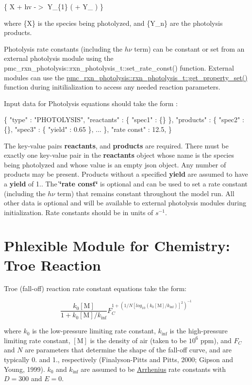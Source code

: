 \{ X + hv -\/$>$ Y\+\_\+\{1\} ( + Y\+\_  ) \}

where \{X\} is the species being photolyzed, and \{Y\+\_\+n\} are the photolysis products.

Photolysis rate constants (including the $h\nu$ term) can be constant or set from an external photolysis module using the {\ttfamily pmc\+\_\+rxn\+\_\+photolysis\+::rxn\+\_\+photolysis\+\_\+t\+::set\+\_\+rate\+\_\+const()} function. External modules can use the {\ttfamily \mbox{\hyperlink{structpmc__rxn__photolysis_1_1rxn__photolysis__t_a4af30a86fec5ca621eae12b191214630}{pmc\+\_\+rxn\+\_\+photolysis\+::rxn\+\_\+photolysis\+\_\+t\+::get\+\_\+property\+\_\+set()}}} function during initilialization to access any needed reaction parameters.

Input data for Photolysis equations should take the form \+: 
\begin{DoxyCode}
\{
  "type" : "PHOTOLYSIS",
  "reactants" : \{
    "spec1" : \{\}
  \},
  "products" : \{
    "spec2" : \{\},
    "spec3" : \{ "yield" : 0.65 \},
    ...
  \},
  "rate const" : 12.5,
\}
\end{DoxyCode}
 The key-\/value pairs {\bfseries reactants}, and {\bfseries products} are required. There must be exactly one key-\/value pair in the {\bfseries reactants} object whose name is the species being photolyzed and whose value is an empty {\ttfamily json} object. Any number of products may be present. Products without a specified {\bfseries yield} are assumed to have a {\bfseries yield} of 1.. The {\bfseries \char`\"{}rate const\char`\"{}} is optional and can be used to set a rate constant (including the $h\nu$ term) that remains constant throughout the model run. All other data is optional and will be available to external photolysis modules during initialization. Rate constants should be in units of $s^{-1}$. \hypertarget{phlex_rxn_troe}{}\section{Phlexible Module for Chemistry\+: Troe Reaction}\label{phlex_rxn_troe}
Troe (fall-\/off) reaction rate constant equations take the form\+:

\[ \frac{k_0[\mbox{M}]}{1+k_0[\mbox{M}]/k_{\inf}}F_C^{1+(1/N[log_{10}(k_0[\mbox{M}]/k_{\inf})]^2)^{-1}} \]

where $k_0$ is the low-\/pressure limiting rate constant, $k_{\inf}$ is the high-\/pressure limiting rate constant, $[\mbox{M}]$ is the density of air (taken to be $10^6$ ppm), and $F_C$ and $N$ are parameters that determine the shape of the fall-\/off curve, and are typically 0. and 1., respectively (Finalyson-\/\+Pitts and Pitts, 2000; Gipson and Young, 1999). $k_0$ and $k_{\inf}$ are assumed to be \mbox{\hyperlink{phlex_rxn_arrhenius}{Arrhenius}} rate constants with $D=300$ and $E=0$.

